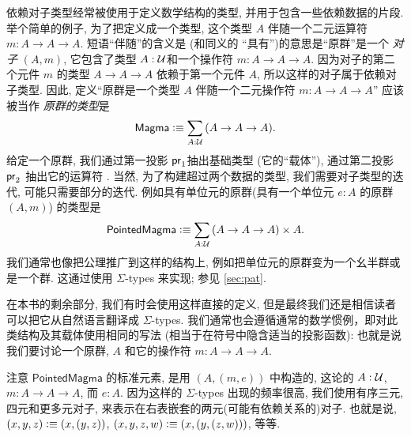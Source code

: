 依赖对子类型经常被使用于定义数学结构的类型, 并用于包含一些依赖数据的片段. 举个简单的例子, 为了把定义成一个类型, 这个类型 $A$ 伴随一个二元运算符 $m:A\to A\to A$. 短语``伴随''的含义是 (和同义的 ``具有'')的意思是``原群''是一个 \emph{对子} $(A,m)$, 它包含了类型 $A:\mathcal{U}$和一个操作符 $m:A\to A\to A$. 因为对子的第二个元件 $m$ 的类型 $A\to A\to A$ 依赖于第一个元件 $A$, 所以这样的对子属于依赖对子类型. 因此, 定义``原群是一个类型 $A$ 伴随一个二元操作符 $m:A\to A\to A$'' 应该被当作 \emph{原群的类型}是 \[ \mathsf{Magma} \defeq \sm{A:\UU} (A\to A\to A). \]
给定一个原群, 我们通过第一投影 $\mathsf{pr}_{1}$抽出基础类型 (它的``载体''), 通过第二投影 $\mathsf{pr}_{2}$ 抽出它的运算符 . 当然, 为了构建超过两个数据的类型, 我们需要对子类型的迭代, 可能只需要部分的迭代. 例如具有单位元的原群(具有一个单位元 $e:A$ 的原群 $(A,m)$) 的类型是 \[ \mathsf{PointedMagma} \defeq \sm{A:\UU} (A\to A\to A) \times A. \]
我们通常也像把公理推广到这样的结构上, 例如把单位元的原群变为一个幺半群或是一个群. 这通过使用 $\Sigma$-types 来实现; 参见 \cref{sec:pat}. 

在本书的剩余部分, 我们有时会使用这样直接的定义, 但是最终我们还是相信读者可以把它从自然语言翻译成 $\Sigma$-types. 我们通常也会遵循通常的数学惯例，即对此类结构及其载体使用相同的写法 (相当于在符号中隐含适当的投影函数): 也就是说我们要讨论一个原群, $A$ 和它的操作符 $m:A\to A\to A$. 

注意 $\mathsf{PointedMagma}$ 的标准元素, 是用 $(A,(m,e))$ 中构造的, 这论的 $A:\mathcal{U}$, $m:A\to A\to A$, 而 $e:A$. 因为这样的 $\Sigma$-types 出现的频率很高, 我们使用有序三元, 四元和更多元对子, 来表示在右表嵌套的两元(可能有依赖关系的)对子. 也就是说, $(x,y,z) \vcentcolon\equiv (x,(y,z))$, $(x,y,z,w)\vcentcolon\equiv (x,(y,(z,w)))$, 等等. 

%